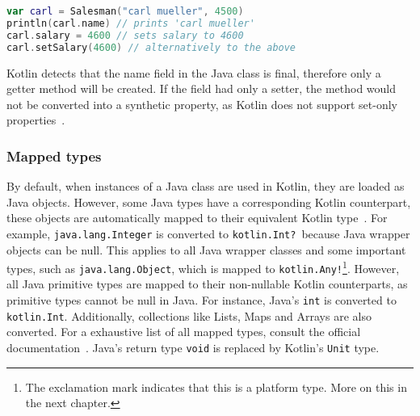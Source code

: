 \documentclass[a4paper,11pt]{article}
\begin{document}
\begin{lstlisting}[language=Kotlin, title={Access a Salesman instance in Kotlin}]
var carl = Salesman("carl mueller", 4500)
println(carl.name) // prints 'carl mueller'
carl.salary = 4600 // sets salary to 4600
carl.setSalary(4600) // alternatively to the above
\end{lstlisting}

Kotlin detects that the name field in the Java class is final, therefore only a getter method will be created. If the field had only a setter, the method would not be converted into a synthetic property, as Kotlin does not support set-only properties~\cite{interop-synthetic-property}.

\subsubsection{Mapped types}
By default, when instances of a Java class are used in Kotlin, they are loaded as Java objects. However, some Java types have a corresponding Kotlin counterpart, these objects are automatically mapped to their equivalent Kotlin type~\cite{interop-mapped-types}. For example, \texttt{java.lang.Integer} is converted to \texttt{kotlin.Int?}~because Java wrapper objects can be null. This applies to all Java wrapper classes and some important types, such as \texttt{java.lang.Object}, which is mapped to \texttt{kotlin.Any!}\footnote{The exclamation mark indicates that this is a platform type. More on this in the next chapter.}. However, all Java primitive types are mapped to their non-nullable Kotlin counterparts, as primitive types cannot be null in Java. For instance, Java's \texttt{int} is converted to \texttt{kotlin.Int}. Additionally, collections like Lists, Maps and Arrays are also converted. For a exhaustive list of all mapped types, consult the official documentation~\cite{interop-mapped-types}. Java's return type \texttt{void} is replaced by Kotlin's \texttt{Unit} type.
\end{document}
